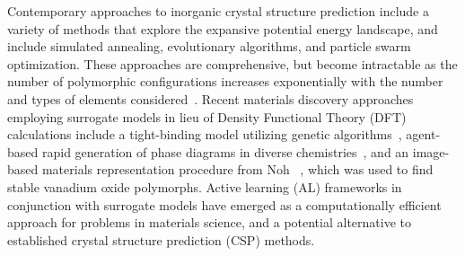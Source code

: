 %
%
%
Contemporary approaches to inorganic crystal structure prediction include a variety of methods that explore the expansive potential energy landscape, and include simulated annealing, evolutionary algorithms, and particle swarm optimization.
\cite{Oganov2006,Lyakhov2010,Glass2006,Wang2012,Pickard2011,Pickard2006,Avery2019,Lonie2011}
%
These approaches are comprehensive, but become intractable as the number of polymorphic configurations increases exponentially with the number and types of elements considered~\cite{Stillinger1999}.
%
%
%
Recent materials discovery approaches employing surrogate models in lieu of Density Functional Theory (DFT) calculations include a tight-binding model utilizing genetic algorithms~\cite{VanDenBossche2018},
agent-based rapid generation of phase diagrams in diverse chemistries~\cite{Montoya2020},
and an image-based materials representation procedure from Noh ~\cite{noh2019inverse},
which was used to find stable vanadium oxide polymorphs.
%
Active learning (AL) frameworks in conjunction with surrogate models have emerged as a computationally efficient approach for problems in materials science, and a potential alternative to established crystal structure prediction (CSP) methods.
\cite{hansen2019atomistic,torres2019low,Jennings2019,podryabinkin2017active,Bassman2018}




